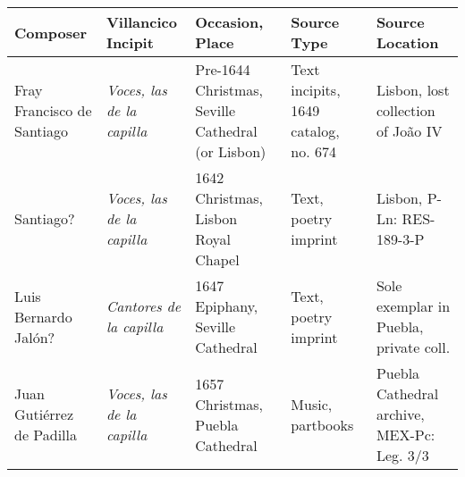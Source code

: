 \documentclass{aac-table}
\begin{document}
\small
\renewcommand{\arraystretch}{1.5}
\begin{tabulary}{\textwidth}{LLLLL}
    \toprule
    Composer & Villancico Incipit & Occasion, Place & Source Type & Source
    Location \\ \midrule
    
    Fray Francisco de Santiago & 
    \emph{Voces, las de la capilla} &
    Pre-1644 Christmas, Seville Cathedral (or Lisbon) &
    Text incipits, 1649 catalog, no. 674 &
    Lisbon, lost collection of João IV \\

    Santiago? & 
    \emph{Voces, las de la capilla} & 
    1642 Christmas, Lisbon Royal Chapel &
    Text, poetry imprint &
    Lisbon, P-Ln: RES-189-3-P \\

    Luis Bernardo Jalón? & 
    \emph{Cantores de la capilla} & 
    1647 Epiphany, Seville Cathedral & 
    Text, poetry imprint & 
    Sole exemplar in Puebla, private coll. \\

    Juan Gutiérrez de Padilla & 
    \emph{Voces, las de la capilla} & 
    1657 Christmas, Puebla Cathedral & 
    Music, partbooks & 
    Puebla Cathedral archive, MEX-Pc: Leg. 3/3 \\
    \bottomrule
\end{tabulary}
\end{document}
